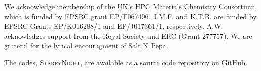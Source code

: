 \documentclass[journal=jacsat,manuscript=communication]{achemso}
\begin{document}
\begin{acknowledgement}
We acknowledge membership of the UK's HPC Materials Chemistry Consortium, which is funded by EPSRC grant EP/F067496. 
J.M.F. and K.T.B. are funded by EPSRC Grants EP/K016288/1 and EP/J017361/1, respectively.
A.W. acknowledges support from the Royal Society and ERC (Grant 277757). 
We are grateful for the lyrical encouragment of Salt N Pepa. 
\end{acknowledgement}

\begin{suppinfo}
    The codes, \textsc{StarryNight}, are available as a source code repository on GitHub\cite{GitHub}.
\end{suppinfo}


\end{document}
